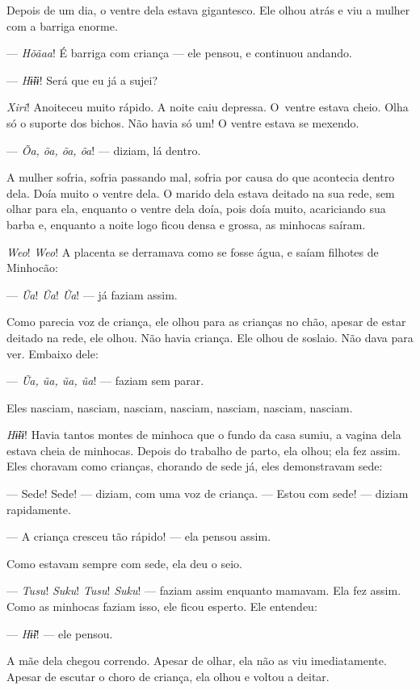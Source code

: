 Depois de um dia, o ventre dela estava gigantesco. Ele olhou atrás e viu
a mulher com a barriga enorme. 

--- \textit{Hõãaa}! É barriga com criança --- ele pensou, e continuou andando. 

--- \textit{Hɨ̃ɨɨ}! Será que eu já a sujei?

\textit{Xiri}! Anoiteceu muito rápido. A noite caiu depressa. O~ventre estava
cheio. Olha só o suporte dos bichos. Não havia só um! O ventre estava se
mexendo. 

--- \textit{Õa, õa, õa, õa}! --- diziam, lá dentro. 

A mulher sofria, sofria passando mal, sofria por causa do que acontecia
dentro dela. Doía muito o ventre dela. O marido dela estava deitado na
sua rede, sem olhar para ela, enquanto o ventre dela doía, pois doía
muito, acariciando sua barba e, enquanto a noite logo ficou densa e
grossa, as minhocas saíram.

\textit{Weo}! \textit{Weo}! A placenta se derramava como se fosse água, e saíam filhotes de
Minhocão:

--- \textit{Ũa}! \textit{Ũa}! \textit{Ũa}! --- já faziam assim. 

Como parecia voz de criança, ele olhou para as crianças no chão, apesar
de estar deitado na rede, ele olhou. Não havia criança. Ele olhou de
soslaio. Não dava para ver. Embaixo dele:

--- \textit{Ũa, ũa, ũa, ũa}! --- faziam sem parar. 

Eles nasciam, nasciam, nasciam, nasciam, nasciam, nasciam, nasciam. 

\textit{Hɨ̃ɨɨ}! Havia tantos montes de minhoca que o fundo da casa sumiu, a vagina
dela estava cheia de minhocas. Depois do trabalho de parto, ela
olhou; ela fez assim. Eles choravam como crianças, chorando de sede
já, eles demonstravam sede: 

--- Sede! Sede! --- diziam, com uma voz de criança. --- Estou com sede! ---
diziam rapidamente. 

--- A criança cresceu tão rápido! --- ela pensou assim. 

Como estavam sempre com sede, ela deu o seio. 

--- \textit{Tusu}! \textit{Suku}! \textit{Tusu}! \textit{Suku}! --- faziam assim enquanto mamavam. Ela
fez assim. Como as minhocas faziam isso, ele ficou esperto. Ele
entendeu: 

--- \textit{Hɨ̃ɨ}! --- ele pensou. 

A mãe dela chegou correndo. Apesar de olhar, ela não as viu
imediatamente. Apesar de escutar o choro de criança, ela olhou e voltou
a deitar. 

